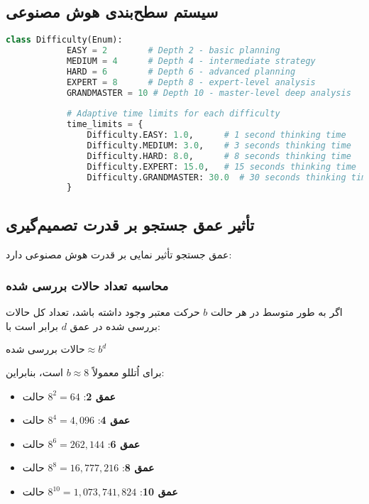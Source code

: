 \documentclass[12pt]{article}
\newenvironment{ltrcode}{\lr\bgroup}{\egroup}
\begin{document}
	\subsection{سیستم سطح‌بندی هوش مصنوعی}
	
	\begin{ltrcode}
		\begin{lstlisting}[language=Python, caption=AI Difficulty System Definition]
			class Difficulty(Enum):
			EASY = 2        # Depth 2 - basic planning
			MEDIUM = 4      # Depth 4 - intermediate strategy
			HARD = 6        # Depth 6 - advanced planning
			EXPERT = 8      # Depth 8 - expert-level analysis
			GRANDMASTER = 10 # Depth 10 - master-level deep analysis
			
			# Adaptive time limits for each difficulty
			time_limits = {
				Difficulty.EASY: 1.0,      # 1 second thinking time
				Difficulty.MEDIUM: 3.0,    # 3 seconds thinking time
				Difficulty.HARD: 8.0,      # 8 seconds thinking time
				Difficulty.EXPERT: 15.0,   # 15 seconds thinking time
				Difficulty.GRANDMASTER: 30.0  # 30 seconds thinking time
			}
		\end{lstlisting}
	\end{ltrcode}
	
	\subsection{تأثیر عمق جستجو بر قدرت تصمیم‌گیری}
	
	عمق جستجو تأثیر نمایی بر قدرت هوش مصنوعی دارد:
	
	\subsubsection{محاسبه تعداد حالات بررسی شده}
	
	اگر به طور متوسط در هر حالت $b$ حرکت معتبر وجود داشته باشد، تعداد کل حالات بررسی شده در عمق $d$ برابر است با:
	
	$\text{حالات بررسی شده} \approx b^d$
	
	برای اُتللو معمولاً $b \approx 8$ است، بنابراین:
	
	\begin{itemize}
		\item \textbf{عمق 2}: $8^2 = 64$ حالت
		\item \textbf{عمق 4}: $8^4 = 4,096$ حالت  
		\item \textbf{عمق 6}: $8^6 = 262,144$ حالت
		\item \textbf{عمق 8}: $8^8 = 16,777,216$ حالت
		\item \textbf{عمق 10}: $8^{10} = 1,073,741,824$ حالت
	\end{itemize}
	
\end{document}
